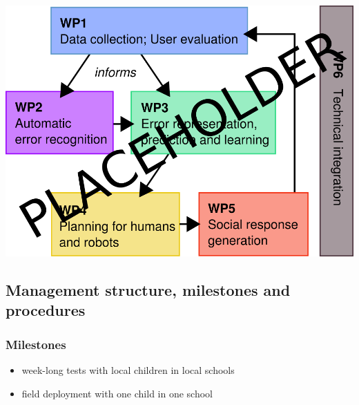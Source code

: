 \documentclass[]{article}
\begin{document}
\includegraphics{figs/wp-interrelations.png}\\

\subsection{Management structure, milestones and procedures}\label{management-structure-milestones-and-procedures}

\subsubsection{Milestones}\label{milestones}

\begin{itemize}

\item
  week-long tests with local children in local schools
\item
  field deployment with one child in one school
\end{itemize}
\end{document}
